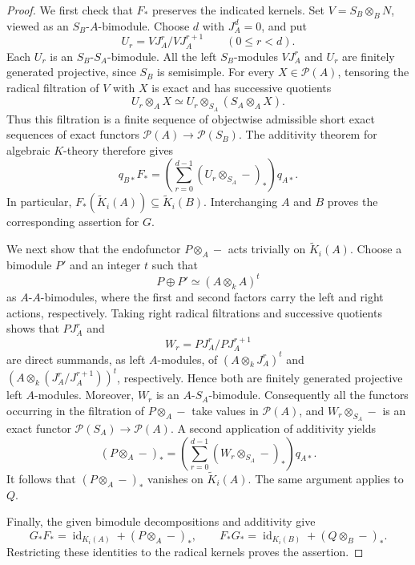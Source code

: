 \documentclass[12pt,a4paper,english,reqno]{amsart}
\numberwithin{equation}{section}
\theoremstyle{plain}
\theoremstyle{definition}
\begin{document}
\begin{proof}
We first check that $F_*$ preserves the indicated kernels.
Set $V=S_B\otimes_BN$, viewed as an $S_B$-$A$-bimodule. Choose
$d$ with $J_A^d=0$, and put
\[
 U_r=VJ_A^r/VJ_A^{r+1}\qquad(0\leq r<d).
\]
Each $U_r$ is an $S_B$-$S_A$-bimodule. All the left $S_B$-modules
$VJ_A^r$ and $U_r$ are finitely generated projective, since $S_B$
is semisimple. For every $X\in\mathcal P(A)$, tensoring the
radical filtration of $V$ with $X$ is exact and has successive
quotients
\[
 U_r\otimes_AX\simeq
 U_r\otimes_{S_A}(S_A\otimes_AX).
\]
Thus this filtration is a finite sequence of objectwise admissible
short exact sequences of exact functors
$\mathcal P(A)\to\mathcal P(S_B)$. The additivity theorem for
algebraic $K$-theory \cite[Chapter~V, Theorem~1.2 and Corollary~1.2.1]{WeibelKbook}
therefore gives
\begin{equation}\label{eq:k-radical-descent}
 q_{B*}F_*
 =\left(\sum_{r=0}^{d-1}
      (U_r\otimes_{S_A}-)_*\right)q_{A*}.
\end{equation}
In particular, $F_*(\widetilde K_i(A))\subseteq\widetilde K_i(B)$.
Interchanging $A$ and $B$ proves the corresponding assertion for $G$.

We next show that the endofunctor $P\otimes_A-$ acts trivially
on $\widetilde K_i(A)$. Choose a bimodule $P'$ and an integer $t$
such that
\[
 P\oplus P'\simeq(A\otimes_kA)^t
\]
as $A$-$A$-bimodules, where the first and second factors carry
the left and right actions, respectively. Taking right radical
filtrations and successive quotients shows that $PJ_A^r$ and
\[
 W_r=PJ_A^r/PJ_A^{r+1}
\]
are direct summands, as left $A$-modules, of
$(A\otimes_kJ_A^r)^t$ and
$(A\otimes_k(J_A^r/J_A^{r+1}))^t$, respectively. Hence both are
finitely generated projective left $A$-modules. Moreover, $W_r$
is an $A$-$S_A$-bimodule. Consequently all the functors occurring
in the filtration of $P\otimes_A-$ take values in
$\mathcal P(A)$, and $W_r\otimes_{S_A}-$ is an exact functor
$\mathcal P(S_A)\to\mathcal P(A)$. A second application of
additivity yields
\begin{equation}\label{eq:k-error-factorization}
 (P\otimes_A-)_*
 =\left(\sum_{r=0}^{d-1}
       (W_r\otimes_{S_A}-)_*\right)q_{A*}.
\end{equation}
It follows that $(P\otimes_A-)_*$ vanishes on
$\widetilde K_i(A)$. The same argument applies to $Q$.

Finally, the given bimodule decompositions and additivity give
\[
 G_*F_* =\operatorname{id}_{K_i(A)}+(P\otimes_A-)_*,
 \qquad
 F_*G_* =\operatorname{id}_{K_i(B)}+(Q\otimes_B-)_*.
\]
Restricting these identities to the radical kernels proves the assertion.
\end{proof}
\end{document}
